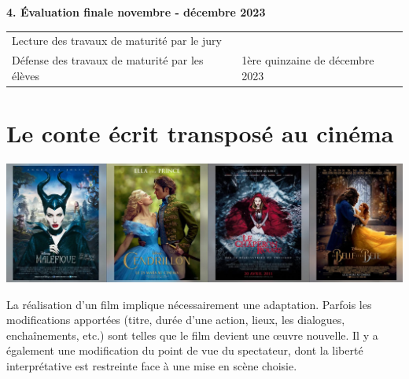 \documentclass[
  10pt,
  french,
  a5paper,
  openany]{book}
\begin{document}

\textbf{4. Évaluation finale \hfill novembre - décembre 2023}

\begin{longtable}[]{@{}ll@{}}
\toprule
\endhead
\begin{minipage}[t]{0.56\columnwidth}\raggedright
Lecture des travaux de maturité par le jury\strut
\end{minipage} & \begin{minipage}[t]{0.38\columnwidth}\raggedright
\strut
\end{minipage}\tabularnewline
\begin{minipage}[t]{0.56\columnwidth}\raggedright
Défense des travaux de maturité par les élèves\strut
\end{minipage} & \begin{minipage}[t]{0.38\columnwidth}\raggedright
1ère quinzaine de décembre 2023\strut
\end{minipage}\tabularnewline
\bottomrule
\end{longtable}


\renewcommand{\chaptermark}[1]{\markboth{\footnotesize\space#1}{}}
\pagestyle{themes}

\hypertarget{le-conte-uxe9crit-transposuxe9-au-cinuxe9ma}{%
\chapter{Le conte écrit transposé au cinéma}\label{le-conte-uxe9crit-transposuxe9-au-cinuxe9ma}}

\begin{center}
\includegraphics[width=1\textwidth,height=\textheight]{images/le-conte-ecrit-transpose-au-cinema.jpg}

\end{center}

La réalisation d'un film implique nécessairement une adaptation. Parfois les modifications apportées (titre, durée d'une action, lieux, les dialogues, enchaînements, etc.) sont telles que le film devient une œuvre nouvelle.
Il y a également une modification du point de vue du spectateur, dont la liberté interprétative est restreinte face à une mise en scène choisie.
\end{document}

